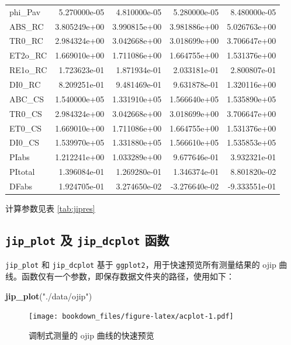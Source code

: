 \documentclass[]{krantz}
\makeatletter
\newenvironment{Shaded}{\begin{snugshade}}{\end{snugshade}}
\newcommand{\KeywordTok}[1]{\textcolor[rgb]{0.13,0.29,0.53}{\textbf{#1}}}
\newcommand{\StringTok}[1]{\textcolor[rgb]{0.31,0.60,0.02}{#1}}
\newcommand{\NormalTok}[1]{#1}
\newenvironment{kframe}{%
\medskip{}
\setlength{\fboxsep}{.8em}
 \def\at@end@of@kframe{}%
 \ifinner\ifhmode%
  \def\at@end@of@kframe{\end{minipage}}%
  \begin{minipage}{\columnwidth}%
 \fi\fi%
 \def\FrameCommand##1{\hskip\@totalleftmargin \hskip-\fboxsep
 \colorbox{shadecolor}{##1}\hskip-\fboxsep
     \hskip-\linewidth \hskip-\@totalleftmargin \hskip\columnwidth}%
 \MakeFramed {\advance\hsize-\width
   \@totalleftmargin\z@ \linewidth\hsize
   \@setminipage}}%
 {\par\unskip\endMakeFramed%
 \at@end@of@kframe}
\renewenvironment{Shaded}{\begin{kframe}}{\end{kframe}}
\theoremstyle{definition}
\theoremstyle{definition}
\theoremstyle{definition}
\theoremstyle{remark}
\makeatother
\begin{document}
\begin{longtable}[t]{lrrrr}
phi\_Pav & 5.270000e-05 & 4.810000e-05 & 5.280000e-05 & 8.480000e-05\\
ABS\_RC & 3.805249e+00 & 3.990815e+00 & 3.981886e+00 & 5.026763e+00\\
TR0\_RC & 2.984324e+00 & 3.042668e+00 & 3.018699e+00 & 3.706647e+00\\
ET2o\_RC & 1.669010e+00 & 1.711086e+00 & 1.664755e+00 & 1.531376e+00\\
\addlinespace
RE1o\_RC & 1.723623e-01 & 1.871934e-01 & 2.033181e-01 & 2.800807e-01\\
DI0\_RC & 8.209251e-01 & 9.481469e-01 & 9.631878e-01 & 1.320116e+00\\
ABC\_CS & 1.540000e+05 & 1.331910e+05 & 1.566640e+05 & 1.535890e+05\\
TR0\_CS & 2.984324e+00 & 3.042668e+00 & 3.018699e+00 & 3.706647e+00\\
ET0\_CS & 1.669010e+00 & 1.711086e+00 & 1.664755e+00 & 1.531376e+00\\
\addlinespace
DI0\_CS & 1.539970e+05 & 1.331880e+05 & 1.566610e+05 & 1.535853e+05\\
PIabs & 1.212241e+00 & 1.033289e+00 & 9.677646e-01 & 3.932321e-01\\
PItotal & 1.396084e-01 & 1.269280e-01 & 1.346374e-01 & 8.801820e-02\\
DFabs & 1.924705e-01 & 3.274650e-02 & -3.276640e-02 & -9.333551e-01\\
\bottomrule
\end{longtable}

计算参数见表 \ref{tab:jipres}

\subsection{\texorpdfstring{\texttt{jip\_plot} 及 \texttt{jip\_dcplot}
函数}{jip\_plot 及 jip\_dcplot 函数}}\label{plotfluor}

\texttt{jip\_plot} 和 \texttt{jip\_dcplot} 基于
\texttt{ggplot2}，用于快速预览所有测量结果的 ojip
曲线。函数仅有一个参数，即保存数据文件夹的路径，使用如下：

\begin{Shaded}
\begin{Highlighting}[]
\KeywordTok{jip_plot}\NormalTok{(}\StringTok{"./data/ojip"}\NormalTok{)}
\end{Highlighting}
\end{Shaded}

\begin{figure}
\centering
\texttt{[image: bookdown\_files/figure-latex/acplot-1.pdf]}
\caption{\label{fig:acplot}调制式测量的 ojip 曲线的快速预览}
\end{figure}
\end{document}

